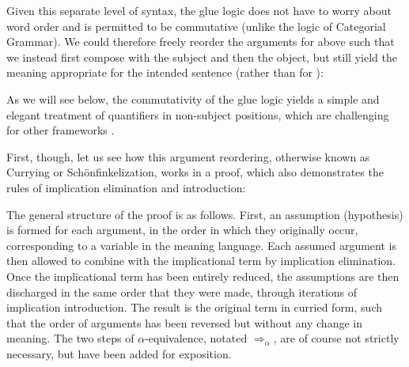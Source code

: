Given this separate level of syntax, the glue logic does not
have to worry about word order and is permitted to be commutative
(unlike the logic of Categorial Grammar). We could therefore freely
reorder the arguments for  above such that we instead
first compose with the subject and then the object, but still yield
the meaning appropriate for the intended sentence 
(rather than for ):
%
\begin{exe}
  
\ex \label{ex:semantics-2}
\end{exe}
%
As we will see below, the commutativity of the glue logic yields a
simple and elegant treatment of quantifiers in non-subject positions,
which are challenging for other frameworks \citep[see, for example, the
careful pedagogical presentation of the issue
in][244--263]{jacobson14}. 

First, though, let us see how this argument reordering, otherwise
known as Currying or Sch\"onfinkelization, works in a
proof, which also demonstrates the rules of implication elimination
and introduction:
%
\begin{exe}
  
\ex \label{ex:semantics-3}
\end{exe}
%
The general structure of the proof is as follows. First, an assumption (hypothesis)
 is formed for each argument, in the order in which they
originally occur, corresponding to a variable in the meaning
language. Each assumed argument is then allowed to combine with the
implicational term by implication elimination. Once the implicational
term has been entirely reduced, the assumptions are then discharged in
the same order that they were made, through iterations of implication
introduction. The result is the original term in curried form, such
that the order of arguments has been reversed but without any change
in meaning. The two steps of $\alpha$-equivalence, notated
$\Rightarrow_\alpha$, are of course  not strictly
necessary, but have been added for exposition. 

